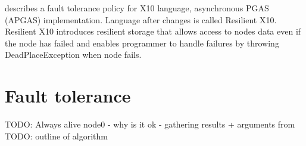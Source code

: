 \documentclass{llncs}
\begin{document}
\cite{RX10} describes a fault tolerance policy for X10 language, asynchronous PGAS (APGAS) implementation.
Language after changes is called Resilient X10.
Resilient X10 introduces resilient storage that allows access to nodes data even if the node has failed
and enables programmer to handle failures by throwing DeadPlaceException when node fails.



\section{Fault tolerance}
TODO: Always alive node0 - why is it ok - gathering results + arguments from \cite{shmem}
TODO: outline of algorithm
\end{document}
